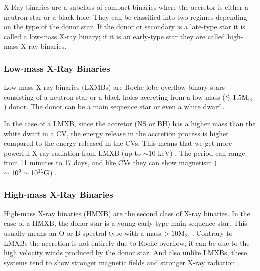 X-Ray binaries are a subclass of compact binaries where the accretor is either a neutron star or a black hole. They can be classified into two regimes depending on the type of the donor star. If the donor or secondary is a late-type star it is called a low-mass X-ray binary; if it is an early-type star they are called high-mass X-ray binaries.

\subsubsection{Low-mass X-Ray Binaries}

Low-mass X-ray binaries (LXMBs) are Roche-lobe overflow binary stars consisting of a neutron star or a black holes accreting from a low-mass ($\lesssim 1.5 \text M_\odot$) donor. The donor can be a main sequence star or even a white dwarf \citep{tauris_formation_2006}.

In the case of a LMXB, since the accretor (NS or BH) has a higher mass than the white dwarf in a CV, the energy release in the accretion process is higher compared to the energy released in the CVs. This means that we get more powerful X-ray radiation from LMXB (up to $\sim 10 \text{ keV}$) \citep{tauris_formation_2006}. The period can range from 11 minutes to 17 days, and like CVs they can show magnetism ($\sim 10^9 \sim 10^{11} \text G$) \citep{tauris_formation_2006}. 


\subsubsection{High-mass X-Ray Binaries}

High-mass X-ray binaries (HMXB) are the second class of X-ray binaries. In the case of a HMXB, the donor star is a young early-type main sequence star. This usually means an O or B spectral type with a mass $> 10 \text M _\odot$ \citep[e.g.][]{tauris_formation_2006}. Contrary to LMXBs the accretion is not entirely due to Roche overflow, it can be due to the high velocity winds produced by the donor star. And also unlike LMXBs, these systems tend to show stronger magnetic fields and stronger X-ray radiation \citep{tauris_formation_2006}.

